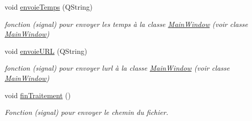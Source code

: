 \begin{DoxyCompactItemize}
void \hyperlink{classTraitement_ae57543af34e05b74a7af460c0e74e87f}{envoie\+Temps} (Q\+String)
\begin{DoxyCompactList}\small\item\em fonction (signal) pour envoyer les temps à la classe \hyperlink{classMainWindow}{Main\+Window} (voir classe \hyperlink{classMainWindow}{Main\+Window}) \end{DoxyCompactList}\item 
void \hyperlink{classTraitement_acc099bf1113669c2e061e8897c3eaeca}{envoie\+U\+RL} (Q\+String)
\begin{DoxyCompactList}\small\item\em fonction (signal) pour envoyer l\textquotesingle{}url à la classe \hyperlink{classMainWindow}{Main\+Window} (voir classe \hyperlink{classMainWindow}{Main\+Window}) \end{DoxyCompactList}\item 
void \hyperlink{classTraitement_a83495c6e878e66511b8af67ee369a012}{fin\+Traitement} ()
\begin{DoxyCompactList}\small\item\em Fonction (signal) pour envoyer le chemin du fichier. \end{DoxyCompactList}\end{DoxyCompactItemize}
